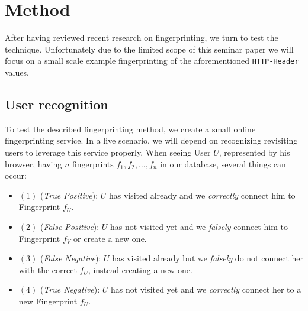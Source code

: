 \section{Method} %
\label{sec:method}

After having reviewed recent research on fingerprinting, we turn to test the technique. Unfortunately due to the limited scope of this seminar paper we will focus on a small scale example fingerprinting of the aforementioned \texttt{HTTP-Header} values. 

\subsection{User recognition}
\label{subsec:userrecognition}
To test the described fingerprinting method, we create a small online fingerprinting service. In a live scenario, we will depend on recognizing revisiting users to leverage this service properly. When seeing User $U$, represented by his browser, having $n$ fingerprints $f_1, f_2, \ldots, f_n$ in our database, several things can occur:

\begin{itemize}
	\item $(1)$ (\emph{True Positive}): $U$ has visited already and we \textit{correctly} connect him to Fingerprint $f_U$.
	\item $(2)$ (\emph{False Positive}): $U$ has not visited yet and we \textit{falsely} connect him to Fingerprint $f_V$ or create a new one.
	\item $(3)$ (\emph{False Negative}): $U$ has visited already but we \textit{falsely} do not connect her with the correct $f_U$, instead creating a new one.
	\item $(4)$ (\emph{True Negative}): $U$ has not visited yet and we \textit{correctly} connect her to a new Fingerprint $f_U$.
	\label{item:cases}
\end{itemize}

